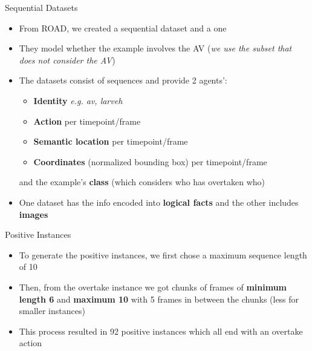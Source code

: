 \documentclass[10pt, aspectratio=169]{beamer}
\begin{document}
\begin{frame}{Sequential Datasets}
    \begin{itemize}
        \setlength{\itemsep}{12pt}
        \item  From ROAD, we created a  sequential dataset and a  one 
        \item  They model whether the example involves the AV (\textit{we use the subset that does not consider the AV}) %
        \item The datasets consist of sequences  and provide \textcolor{umBlueLighter}{2 agents'}:
        \vspace{6pt}
        \begin{itemize}
            \setlength{\itemsep}{3pt}
            \item \textbf{Identity} \textit{e.g. av, larveh}
            \item \textbf{Action} per timepoint/frame
            \item \textbf{Semantic location} per timepoint/frame
            \item \textbf{Coordinates} (normalized bounding box) per timepoint/frame
        \end{itemize}
        \vspace{6pt}
        and the example's \textbf{class} (which considers who has overtaken who)
        \item One dataset has the info encoded into \textbf{logical facts} and the other includes \textbf{images}
    \end{itemize}
\end{frame}



\begin{frame}{Positive Instances}
    \begin{itemize}
        \setlength{\itemsep}{13pt}
        \item To generate the positive instances, we first chose a  maximum sequence length of 10
        \item Then, from the overtake instance we got chunks of frames of \textbf{minimum length 6} and\textbf{ maximum 10} with 5 frames in between the chunks (less for smaller instances)
        \item This process resulted in \textcolor{umBlueLighter}{92 positive instances}  which all end with an overtake action
    \end{itemize}
\end{frame}
\end{document}
